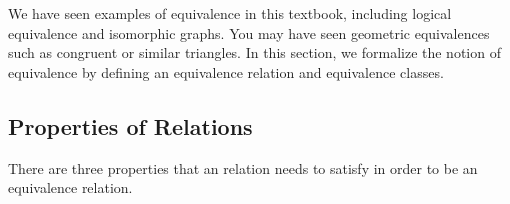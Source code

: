 \section{\secequivrel}
\label{sec_equiv_relations}

We have seen examples of equivalence in this textbook, including logical equivalence and isomorphic graphs.  You may have seen geometric equivalences such as congruent or similar triangles.  In this section, we formalize the notion of equivalence by defining an equivalence relation and equivalence classes.


\newcommand{\subrelppty}{Properties of Relations}
\subsection{\subrelppty}
\label{sub_properties_relations}

There are three properties that an relation needs to satisfy in order to be an equivalence relation.

